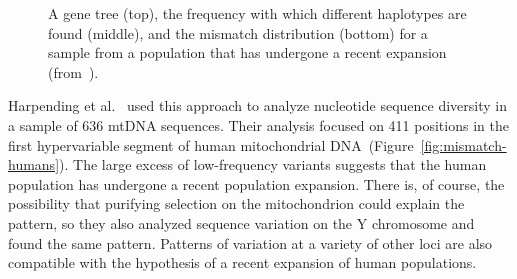 \begin{figure}
\begin{center}
\end{center}
\caption{A gene tree (top), the frequency with which different
  haplotypes are found (middle), and the mismatch distribution
  (bottom) for a sample from a population that has undergone a recent
  expansion
  (from~\cite{Harpending-etal-1998}).}\label{fig:mismatch-expansion}  
\end{figure}

Harpending et al.~\cite{Harpending-etal-1998} used this approach to
analyze nucleotide sequence diversity in a sample of 636 mtDNA
sequences. Their analysis focused on 411 positions in the first
hypervariable segment of human mitochondrial
DNA~(Figure~\ref{fig:mismatch-humans}). The large excess of
low-frequency variants suggests that the human population has
undergone a recent population expansion. There is, of course, the
possibility that purifying selection on the mitochondrion could
explain the pattern, so they also analyzed sequence variation on the Y
chromosome and found the same pattern. Patterns of variation at a
variety of other loci are also compatible with the hypothesis of a
recent expansion of human populations.

